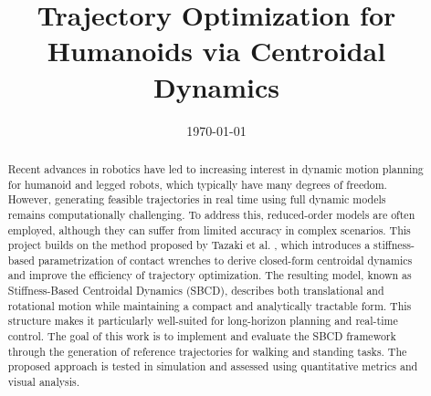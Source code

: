 \documentclass[12pt,a4paper,oneside]{article}
\title{Trajectory Optimization for Humanoids via Centroidal Dynamics}	                                    %
\date{\today}									    %
\theoremstyle{definition}
\theoremstyle{remark} %
\begin{document}

\newpage
\tableofcontents
\newpage
\begin{abstract}
\begin{sloppypar}
\noindent
Recent advances in robotics have led to increasing interest in dynamic motion planning for humanoid and legged robots, which typically have many degrees of freedom. However, generating feasible trajectories in real time using full dynamic models remains computationally challenging. To address this, reduced-order models are often employed, although they can suffer from limited accuracy in complex scenarios. This project builds on the method proposed by Tazaki et al. \cite{tazaki2024trajectory}, which introduces a stiffness-based parametrization of contact wrenches to derive closed-form centroidal dynamics and improve the efficiency of trajectory optimization. The resulting model, known as Stiffness-Based Centroidal Dynamics (SBCD), describes both translational and rotational motion while maintaining a compact and analytically tractable form. This structure makes it particularly well-suited for long-horizon planning and real-time control. The goal of this work is to implement and evaluate the SBCD framework through the generation of reference trajectories for walking and standing tasks. The proposed approach is tested in simulation and assessed using quantitative metrics and visual analysis.
\end{sloppypar}
\end{abstract}
\newpage

\clearpage

\clearpage

\clearpage

\clearpage

\clearpage

\clearpage



\end{document}

